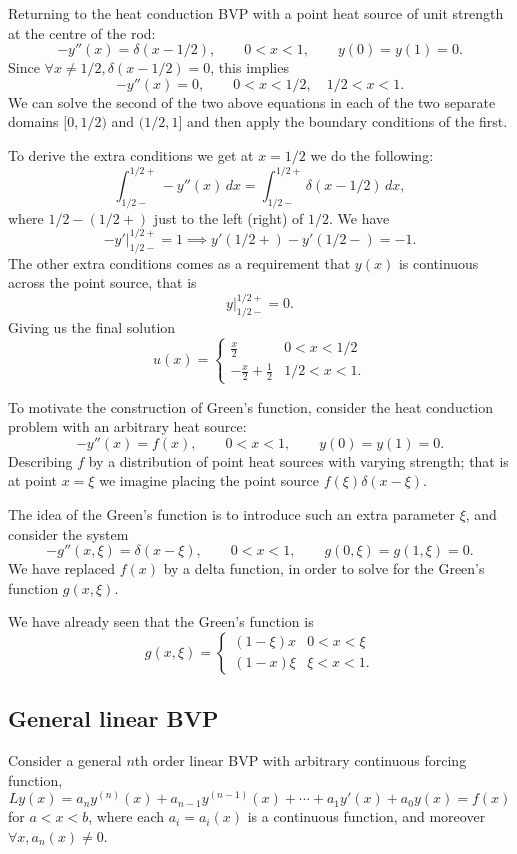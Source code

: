 \documentclass[10pt, a4paper]{article}
\begin{document}
Returning to the heat conduction BVP with a point heat source of unit strength at the centre of the rod:
\[
-y''(x) = \delta(x - 1 / 2),\qquad 0 < x < 1,\qquad y(0) = y(1) = 0.
\]
Since $\forall x \neq 1 / 2, \delta(x - 1 / 2) = 0$,
this implies
\[
-y''(x) = 0,\qquad 0 < x < 1 / 2,\quad 1 / 2 < x < 1.
\]
We can solve the second of the two above equations in each of the two separate domains $[0, 1 / 2)$ and $(1 / 2, 1]$ and then apply the boundary conditions of the first.

To derive the extra conditions we get at $x = 1 / 2$ we do the following:
\[
\int_{1 / 2-}^{1 / 2+}-y''(x)\,dx = \int_{1 / 2-}^{1 / 2+}\delta(x - 1 / 2)\,dx,
\]
where $1 / 2 - (1 / 2+)$ just to the left
(right)
of $1 / 2$.
We have
\[
-y'\biggr|_{1 / 2-}^{1 / 2+} = 1 \implies y'(1 / 2+) - y'(1 / 2-) = -1.
\]
The other extra conditions comes as a requirement that $y(x)$ is continuous across the point source,
that is
\[
y\biggr|_{1 / 2-}^{1 / 2+} = 0.
\]
Giving us the final solution
\[
u(x) = \begin{cases}
    \frac{x}{2} & 0 < x < 1 / 2 \\
    -\frac{x}{2} + \frac{1}{2} & 1 / 2 < x < 1.
\end{cases}
\]


To motivate the construction of Green's function,
consider the heat conduction problem with an arbitrary heat source:
\[
-y''(x) = f(x),\qquad 0 < x < 1,\qquad y(0) = y(1) = 0.
\]
Describing $f$ by a distribution of point heat sources with varying strength;
that is at point $x = \xi$ we imagine placing the point source $f(\xi)\delta(x - \xi)$.

The idea of the Green's function is to introduce such an extra parameter $\xi$,
and consider the system
\[
-g''(x, \xi) = \delta(x - \xi),\qquad 0 < x < 1,\qquad g(0, \xi) = g(1, \xi) = 0.
\]
We have replaced $f(x)$ by a delta function,
in order to solve for the Green's function $g(x, \xi)$.

We have already seen that the Green's function is
\[
g(x, \xi) = \begin{cases}
    (1 - \xi)x & 0 < x < \xi \\
    (1 - x)\xi & \xi < x < 1.
\end{cases}
\]

\subsection{General linear BVP}
Consider a general $n$th order linear BVP with arbitrary continuous forcing function,
\[
Ly(x) = a_ny ^ {(n)}(x) + a_{n - 1}y ^ {(n - 1)}(x) + \dotsi + a_1y'(x) + a_0y(x) = f(x)
\]
for $a < x < b$,
where each $a_i = a_i(x)$ is a continuous function,
and moreover $\forall x, a_n(x) \neq 0$.
\end{document}
